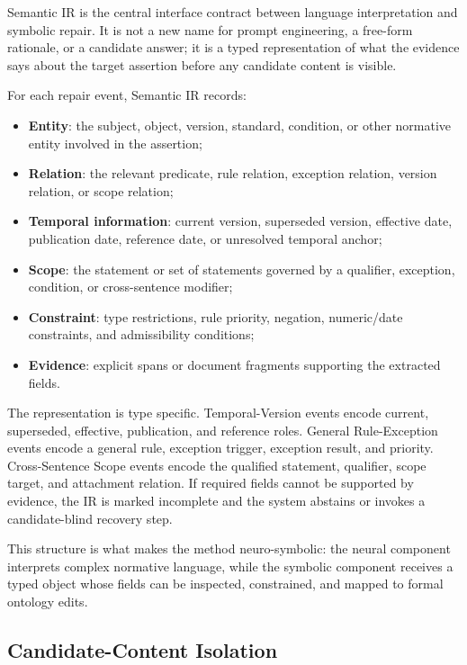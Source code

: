 \documentclass[conference]{IEEEtran}
\begin{document}
Semantic IR is the central interface contract between language interpretation and symbolic repair. It is not a new name for prompt engineering, a free-form rationale, or a candidate answer; it is a typed representation of what the evidence says about the target assertion before any candidate content is visible.

For each repair event, Semantic IR records:
\begin{itemize}
    \item \textbf{Entity}: the subject, object, version, standard, condition, or other normative entity involved in the assertion;
    \item \textbf{Relation}: the relevant predicate, rule relation, exception relation, version relation, or scope relation;
    \item \textbf{Temporal information}: current version, superseded version, effective date, publication date, reference date, or unresolved temporal anchor;
    \item \textbf{Scope}: the statement or set of statements governed by a qualifier, exception, condition, or cross-sentence modifier;
    \item \textbf{Constraint}: type restrictions, rule priority, negation, numeric/date constraints, and admissibility conditions;
    \item \textbf{Evidence}: explicit spans or document fragments supporting the extracted fields.
\end{itemize}

The representation is type specific. Temporal-Version events encode current, superseded, effective, publication, and reference roles. General Rule-Exception events encode a general rule, exception trigger, exception result, and priority. Cross-Sentence Scope events encode the qualified statement, qualifier, scope target, and attachment relation. If required fields cannot be supported by evidence, the IR is marked incomplete and the system abstains or invokes a candidate-blind recovery step.

This structure is what makes the method neuro-symbolic: the neural component interprets complex normative language, while the symbolic component receives a typed object whose fields can be inspected, constrained, and mapped to formal ontology edits.

\subsection{Candidate-Content Isolation}
\end{document}
